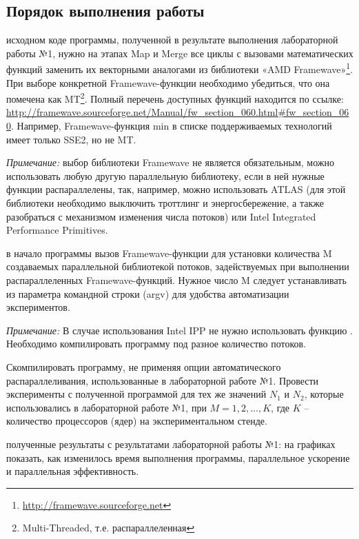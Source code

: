 \subsection{Порядок выполнения работы}
\begin{enumerate}
     исходном коде программы, полученной в результате выполнения лабораторной работы №1, нужно на этапах Map и Merge все циклы с вызовами математических функций заменить их векторными аналогами из библиотеки «AMD Framewave»\footnote{\url{http://framewave.sourceforge.net}}. При выборе конкретной Framewave-функции необходимо убедиться, что она помечена как MT\footnote{Multi-Threaded, т.е. распараллеленная}. Полный перечень доступных функций находится по ссылке: \url{http://framewave.sourceforge.net/Manual/fw_section_060.html#fw_section_060}. \quad Например, Framewave-функция min в списке поддерживаемых технологий имеет только SSE2, но не MT\@. 
	
    \textit{Примечание:} выбор библиотеки Framewave не является обязательным, можно использовать любую другую параллельную библиотеку, если в ней нужные функции распараллелены, так, например, можно использовать ATLAS (для этой библиотеки необходимо выключить троттлинг и энергосбережение, а также разобраться с механизмом изменения числа потоков) или Intel Integrated Performance Primitives.
	
     в начало программы вызов Framewave-функции  для установки количества M создаваемых параллельной библиотекой потоков, задействуемых при выполнении распараллеленных Framewave-функций. Нужное число M следует устанавливать из параметра командной строки (argv) для удобства автоматизации экспериментов.
	
    \textit{Примечание:} В случае использования Intel IPP не нужно использовать функцию . Необходимо компилировать программу под разное количество потоков.
	
    Скомпилировать программу, не применяя опции автоматического распараллеливания, использованные в лабораторной работе №1. Провести эксперименты с полученной программой для тех же значений $N_1$ и $N_2$, которые использовались в лабораторной работе №1, при $M = 1, 2, \ldots , K$, где $K$ – количество процессоров (ядер) на экспериментальном стенде.
		
     полученные результаты с результатами лабораторной работы №1: на графиках показать, как изменилось время выполнения программы, параллельное ускорение и параллельная эффективность.
		

\end{enumerate}
